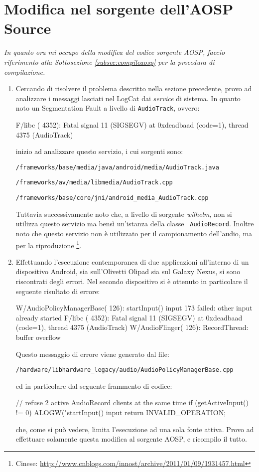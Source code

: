 
\section{Modifica nel sorgente dell'AOSP Source}\label{sec:modifaosp}
\textit{In quanto ora mi occupo della modifica del codice sorgente 
AOSP, faccio riferimento alla Sottosezione \vref{subsec:compileaosp} per 
la procedura di compilazione.}
\bigskip

\begin{enumerate}
\item Cercando di risolvere il problema descritto nella sezione precedente,
	provo ad analizzare i messaggi lasciati nel LogCat dai \textit{service}
	di sistema. In quanto noto un Segmentation Fault a livello di 
	\texttt{\small AudioTrack}, ovvero:
	\begin{bash}
F/libc ( 4352): Fatal signal 11 (SIGSEGV) at 0xdeadbaad (code=1), thread 4375 (AudioTrack)
\end{bash}
	inizio ad analizzare questo servizio, i cui sorgenti sono:
	\begin{center}
	\texttt{\small \AOSP/frameworks/base/media/java/android/media/AudioTrack.java}
	
	\texttt{\small \AOSP/frameworks/av/media/libmedia/AudioTrack.cpp}
	
	\texttt{\small \AOSP/frameworks/base/core/jni/android\_media\_AudioTrack.cpp}
	\end{center}
	Tuttavia successivamente noto che, a livello di sorgente \textit{wilhelm}, non
	si utilizza questo servizio ma bensì un'istanza della classe \texttt{\small
	AudioRecord}. Inoltre noto che questo servizio non è utilizzato per il
	campionamento dell'audio, ma per la riproduzione
	\footnote{Cinese: \url{http://www.cnblogs.com/innost/archive/2011/01/09/1931457.html}}.

\item Effettuando l'esecuzione contemporanea di due applicazioni all'interno di
	un dispositivo Android, sia sull'Olivetti Olipad sia sul Galaxy Nexus,
	si sono riscontrati degli errori. Nel
	secondo dispositivo si è ottenuto in particolare il seguente risultato
	di errore:
\begin{bash}
W/AudioPolicyManagerBase(  126): startInput() input 173 failed: other input already started
F/libc    ( 4352): Fatal signal 11 (SIGSEGV) at 0xdeadbaad (code=1), thread 4375 (AudioTrack)
W/AudioFlinger(  126): RecordThread: buffer overflow
\end{bash}
        Questo messaggio di errore viene generato dal file:
\begin{center}
\texttt{\small \AOSP/hardware/libhardware\_legacy/audio/AudioPolicyManagerBase.cpp}
\end{center}
        ed in particolare dal seguente frammento di codice:
\begin{java}
// refuse 2 active AudioRecord clients at the same time
if (getActiveInput() != 0) {
    ALOGW("startInput() input %
    return INVALID_OPERATION;
}
\end{java}
	che, come si può vedere, limita l'esecuzione ad una sola fonte attiva.
	Provo ad effettuare solamente questa modifica al sorgente
	AOSP, e  ricompilo il tutto.
	

\end{enumerate}
